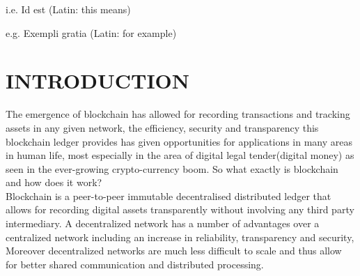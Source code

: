 \documentclass[a4paper,12pt]{article}
\begin{document}
%
%
\maketitle

\makeabstract

\maketableofcontents

\makelistoffigures



%
\makelistofabbrv
\begin{abbrv}
    \item[i.e.] Id est (Latin: this means)
    \item[e.g.] Exempli gratia (Latin: for example)
\end{abbrv}
\newpage

\setcounter{page}{1} %


%
%

\section{INTRODUCTION}



The emergence of blockchain has allowed for recording transactions and tracking assets in any given network, the efficiency, security and transparency this blockchain ledger provides has given opportunities for applications in many areas in human life, most especially in the area of digital legal tender(digital money) as seen in the ever-growing crypto-currency boom. So what exactly is blockchain and how does it work?\\

Blockchain is a peer-to-peer immutable decentralised distributed ledger that allows for recording digital assets transparently without involving any third party intermediary. A decentralized network has a number of advantages over a centralized network including an increase in reliability, transparency and security, Moreover decentralized networks are much less difficult to scale and thus allow for better shared communication and distributed processing. \\
\end{document}

